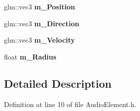 \begin{DoxyCompactItemize}
\item 
glm\+::vec3 {\bfseries m\+\_\+\+Position}\hypertarget{class_i_o_1_1_audio_1_1_audio_element_aeac2de4d6e56351d66072ff105c92069}{}\label{class_i_o_1_1_audio_1_1_audio_element_aeac2de4d6e56351d66072ff105c92069}

\item 
glm\+::vec3 {\bfseries m\+\_\+\+Direction}\hypertarget{class_i_o_1_1_audio_1_1_audio_element_a8186dfc5446ca0409f7c259eb2a9f222}{}\label{class_i_o_1_1_audio_1_1_audio_element_a8186dfc5446ca0409f7c259eb2a9f222}

\item 
glm\+::vec3 {\bfseries m\+\_\+\+Velocity}\hypertarget{class_i_o_1_1_audio_1_1_audio_element_a0b68136368101c51108886435dd94b00}{}\label{class_i_o_1_1_audio_1_1_audio_element_a0b68136368101c51108886435dd94b00}

\item 
float {\bfseries m\+\_\+\+Radius}\hypertarget{class_i_o_1_1_audio_1_1_audio_element_a08db2f7eadcda0d391722723afb68bca}{}\label{class_i_o_1_1_audio_1_1_audio_element_a08db2f7eadcda0d391722723afb68bca}

\end{DoxyCompactItemize}


\subsection{Detailed Description}


Definition at line 10 of file Audio\+Element.\+h.

